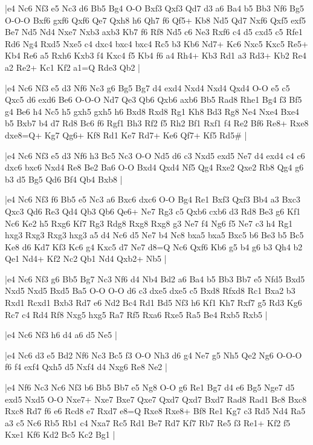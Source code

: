 \whitename{}
\blackname{}
\makegametitle
|e4 Nc6 Nf3 e5 Nc3 d6 Bb5 Bg4 O-O Bxf3 Qxf3 Qd7 d3 a6 Ba4 b5 Bb3 Nf6 Bg5 O-O-O Bxf6 gxf6 Qxf6 Qe7 Qxh8 h6 Qh7 f6 Qf5+ Kb8 Nd5 Qd7 Nxf6 Qxf5 exf5 Be7 Nd5 Nd4 Nxe7 Nxb3 axb3 Kb7 f6 Rf8 Nd5 c6 Ne3 Rxf6 c4 d5 cxd5 c5 Rfe1 Rd6 Ng4 Rxd5 Nxe5 c4 dxc4 bxc4 bxc4 Rc5 b3 Kb6 Nd7+ Kc6 Nxc5 Kxc5 Re5+ Kb4 Re6 a5 Rxh6 Kxb3 f4 Kxc4 f5 Kb4 f6 a4 Rh4+ Kb3 Rd1 a3 Rd3+ Kb2 Re4 a2 Re2+ Kc1 Kf2 a1=Q Rde3 Qb2  |

\whitename{}
\blackname{}
\makegametitle
|e4 Nc6 Nf3 e5 d3 Nf6 Nc3 g6 Bg5 Bg7 d4 exd4 Nxd4 Nxd4 Qxd4 O-O e5 c5 Qxc5 d6 exd6 Be6 O-O-O Nd7 Qe3 Qb6 Qxb6 axb6 Bb5 Rad8 Rhe1 Bg4 f3 Bf5 g4 Be6 h4 Nc5 h5 gxh5 gxh5 h6 Bxd8 Rxd8 Rg1 Kh8 Bd3 Rg8 Ne4 Nxe4 Bxe4 b5 Bxb7 b4 d7 Rd8 Bc6 f6 Rgf1 Bh3 Rf2 f5 Rh2 Bf1 Rxf1 f4 Re2 Bf6 Re8+ Rxe8 dxe8=Q+ Kg7 Qg6+ Kf8 Rd1 Ke7 Rd7+ Ke6 Qf7+ Kf5 Rd5\#  |

\whitename{}
\blackname{}
\makegametitle
|e4 Nc6 Nf3 e5 d3 Nf6 h3 Bc5 Nc3 O-O Nd5 d6 c3 Nxd5 exd5 Ne7 d4 exd4 c4 c6 dxc6 bxc6 Nxd4 Re8 Be2 Ba6 O-O Bxd4 Qxd4 Nf5 Qg4 Rxe2 Qxe2 Rb8 Qg4 g6 b3 d5 Bg5 Qd6 Bf4 Qb4 Bxb8  |

\whitename{}
\blackname{}
\makegametitle
|e4 Nc6 Nf3 f6 Bb5 e5 Nc3 a6 Bxc6 dxc6 O-O Bg4 Re1 Bxf3 Qxf3 Bb4 a3 Bxc3 Qxc3 Qd6 Re3 Qd4 Qb3 Qb6 Qe6+ Ne7 Rg3 c5 Qxb6 cxb6 d3 Rd8 Be3 g6 Kf1 Nc6 Ke2 h5 Rxg6 Kf7 Rg3 Rdg8 Rxg8 Rxg8 g3 Ne7 f4 Ng6 f5 Ne7 c3 h4 Rg1 hxg3 Rxg3 Rxg3 hxg3 a5 d4 Nc6 d5 Ne7 b4 Nc8 bxa5 bxa5 Bxc5 b6 Be3 b5 Bc5 Ke8 d6 Kd7 Kf3 Kc6 g4 Kxc5 d7 Ne7 d8=Q Nc6 Qxf6 Kb6 g5 b4 g6 b3 Qh4 b2 Qe1 Nd4+ Kf2 Nc2 Qb1 Nd4 Qxb2+ Nb5  |

\whitename{}
\blackname{}
\makegametitle
|e4 Nc6 Nf3 g6 Bb5 Bg7 Nc3 Nf6 d4 Nb4 Bd2 a6 Ba4 b5 Bb3 Bb7 e5 Nfd5 Bxd5 Nxd5 Nxd5 Bxd5 Ba5 O-O O-O d6 c3 dxe5 dxe5 c5 Bxd8 Rfxd8 Rc1 Bxa2 b3 Rxd1 Rcxd1 Bxb3 Rd7 e6 Nd2 Bc4 Rd1 Bd5 Nf3 h6 Kf1 Kh7 Rxf7 g5 Rd3 Kg6 Rc7 c4 Rd4 Rf8 Nxg5 hxg5 Ra7 Rf5 Rxa6 Rxe5 Ra5 Be4 Rxb5 Rxb5  |

\whitename{}
\blackname{}
\makegametitle
|e4 Nc6 Nf3 h6 d4 a6 d5 Ne5  |

\whitename{}
\blackname{}
\makegametitle
|e4 Nc6 d3 e5 Bd2 Nf6 Nc3 Bc5 f3 O-O Nh3 d6 g4 Ne7 g5 Nh5 Qe2 Ng6 O-O-O f6 f4 exf4 Qxh5 d5 Nxf4 d4 Nxg6 Re8 Ne2  |

\whitename{}
\blackname{}
\makegametitle
|e4 Nf6 Nc3 Nc6 Nf3 b6 Bb5 Bb7 e5 Ng8 O-O g6 Re1 Bg7 d4 e6 Bg5 Nge7 d5 exd5 Nxd5 O-O Nxe7+ Nxe7 Bxe7 Qxe7 Qxd7 Qxd7 Bxd7 Rad8 Rad1 Bc8 Bxc8 Rxc8 Rd7 f6 e6 Rcd8 e7 Rxd7 e8=Q Rxe8 Rxe8+ Bf8 Re1 Kg7 c3 Rd5 Nd4 Ra5 a3 c5 Nc6 Rb5 Rb1 c4 Nxa7 Rc5 Rd1 Be7 Rd7 Kf7 Rb7 Re5 f3 Re1+ Kf2 f5 Kxe1 Kf6 Kd2 Bc5 Kc2 Bg1  |

